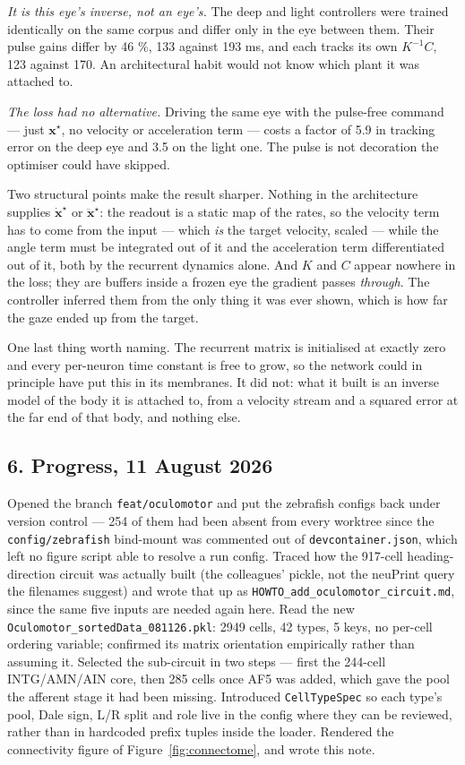 \documentclass[10pt]{article}
\begin{document}
\emph{It is this eye's inverse, not an eye's.} The deep and light controllers were trained
identically on the same corpus and differ only in the eye between them. Their pulse gains
differ by 46 \%, 133 against 193 ms, and each tracks its own $K^{-1}C$, 123 against 170. An
architectural habit would not know which plant it was attached to.

\emph{The loss had no alternative.} Driving the same eye with the pulse-free command ---
just $\mathbf{x}^{\star}$, no velocity or acceleration term --- costs a factor of 5.9 in
tracking error on the deep eye and 3.5 on the light one. The pulse is not decoration the
optimiser could have skipped.

Two structural points make the result sharper. Nothing in the architecture supplies
$\dot{\mathbf{x}}^{\star}$ or $\ddot{\mathbf{x}}^{\star}$: the readout is a static map of
the rates, so the velocity term has to come from the input --- which \emph{is} the target
velocity, scaled --- while the angle term must be integrated out of it and the acceleration
term differentiated out of it, both by the recurrent dynamics alone. And $K$ and $C$ appear
nowhere in the loss; they are buffers inside a frozen eye the gradient passes
\emph{through}. The controller inferred them from the only thing it was ever shown, which is
how far the gaze ended up from the target.

One last thing worth naming. The recurrent matrix is initialised at exactly zero and every
per-neuron time constant is free to grow, so the network could in principle have put this in
its membranes. It did not: what it built is an inverse model of the body it is attached to,
from a velocity stream and a squared error at the far end of that body, and nothing else.

\subsection*{6. Progress, 11 August 2026}

Opened the branch \texttt{feat/oculomotor} and put the zebrafish configs back under version
control --- 254 of them had been absent from every worktree since the
\texttt{config/zebrafish} bind-mount was commented out of \texttt{devcontainer.json}, which
left no figure script able to resolve a run config. Traced how the 917-cell
heading-direction circuit was actually built (the colleagues' pickle, not the neuPrint query
the filenames suggest) and wrote that up as \texttt{HOWTO\_add\_oculomotor\_circuit.md},
since the same five inputs are needed again here. Read the new
\texttt{Oculomotor\_sortedData\_081126.pkl}: 2949 cells, 42 types, 5 keys, no per-cell
ordering variable; confirmed its matrix orientation empirically rather than assuming it.
Selected the sub-circuit in two steps --- first the 244-cell INTG/AMN/AIN core, then 285
cells once AF5 was added, which gave the pool the afferent stage it had been missing.
Introduced \texttt{CellTypeSpec} so each type's pool, Dale sign, L/R split and role live in
the config where they can be reviewed, rather than in hardcoded prefix tuples inside the
loader. Rendered the connectivity figure of Figure~\ref{fig:connectome}, and wrote this
note.
\end{document}
